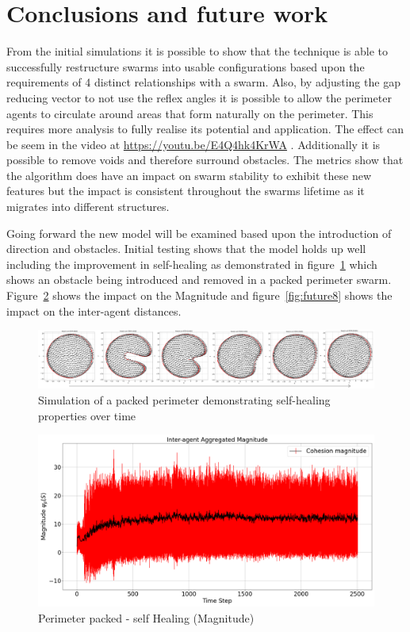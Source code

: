\documentclass[12pt,a4paper]{IEEEtran}
\begin{document}
\section{Conclusions and future work}\label{conclusions}
From the initial simulations it is possible to show that the technique is able to successfully restructure swarms into usable configurations based upon the requirements of 4 distinct relationships with a swarm. Also, by adjusting the gap reducing vector to not use the reflex angles it is possible to allow the perimeter agents to circulate around areas that form naturally on the perimeter. This requires more analysis to fully realise its potential and application. The effect can be seem in the video at \url{https://youtu.be/E4Q4hk4KrWA} . Additionally it is possible to remove voids and therefore surround obstacles. The metrics show that the algorithm does have an impact on swarm stability to exhibit these new features but the impact is consistent throughout the swarms lifetime as it migrates into different structures.

Going forward the new model will be examined based upon the introduction of direction and obstacles. Initial testing shows that the model holds up well including the improvement in self-healing as demonstrated in figure~\ref{fig:packedSelfHealing} which shows an obstacle being introduced and removed in a packed perimeter swarm. Figure~\ref{fig:future7} shows the impact on the Magnitude and figure~\ref{fig:future8} shows the impact on the inter-agent distances.

\begin{figure}[H]
  \begin{center}
    \includegraphics[width=17.6cm]{figures/FutureTime}
  \end{center}
  \caption{Simulation of a packed perimeter demonstrating self-healing properties over time\label{fig:packedSelfHealing}}
\end{figure}

\begin{figure}[H]
	\begin{center}
		\includegraphics[width=1.0\linewidth]{figures/Future7}
	\end{center}
	\caption{Perimeter packed - self Healing (Magnitude)\label{fig:future7}}
\end{figure}
\end{document}
